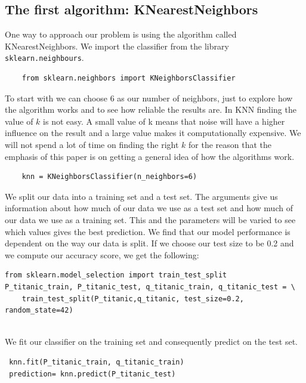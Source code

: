\documentclass[11pt]{article}
\begin{document}
\subsection{The first algorithm: KNearestNeighbors}
\label{sec:org7a9cc45}

One way to approach our problem is using the algorithm called KNearestNeighbors. We import the classifier from the library \texttt{sklearn.neighbours}. 

\begin{verbatim}
    from sklearn.neighbors import KNeighborsClassifier
\end{verbatim}

To start with we can choose 6 as our number of neighbors, just to explore how the algorithm works and to see how reliable the results are. In KNN finding the value of \(k\) is not easy. A small value of k means that noise will have a higher influence on the result and a large value makes it computationally expensive. We will not spend a lot of time on finding the right \(k\) for the reason that the emphasis of this paper is on getting a general idea of how the algorithms work. 

\begin{verbatim}
    knn = KNeighborsClassifier(n_neighbors=6)
\end{verbatim}

We split our data into a training set and a test set.  The
arguments give us information about how much of our data we use as a
test set and how much of our data we use as a training set. This and
the parameters will be varied to see which values gives the best
prediction. We find that our model performance is dependent on the way our data is split. If we choose our test size to be 0.2 and we compute our accuracy score, we get the following:   


\begin{verbatim}
from sklearn.model_selection import train_test_split
P_titanic_train, P_titanic_test, q_titanic_train, q_titanic_test = \
    train_test_split(P_titanic,q_titanic, test_size=0.2, random_state=42)
 
\end{verbatim}

We fit our classifier on the training set and consequently predict on the test set.  

\begin{verbatim}
 knn.fit(P_titanic_train, q_titanic_train)
 prediction= knn.predict(P_titanic_test) 

\end{verbatim}
\end{document}
